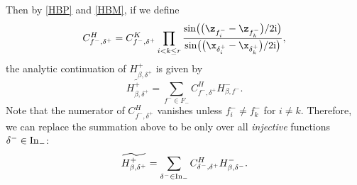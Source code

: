 Then by \eqref{HBP} and \eqref{HBM}, if we define
\[
C^H_{f^-, \delta^+} = C^K_{f^-, \delta^+} \prod_{i<k\leq r} \frac{\sin\bigl(\bigl(\z_{f^-_i} - \z_{f^-_k}\bigr)/2{\rm i}\bigr)}{ \sin\bigl(\bigl(\x_{\delta^+_i} - \x_{\delta^+_k}\bigr)/2{\rm i}\bigr)},
\]
the analytic continuation of $H^{+}_{\beta, \delta^+}$ is given by
\[
\widetilde{H^{+}_{\beta, \delta^+}} =\sum_{f^- \in F_-} C^H_{f^-, \delta^+} H^{-}_{\beta, f^-}.
\]
Note that the numerator of $C^H_{f^-, \delta^+}$ vanishes unless $f^-_i \neq f^-_k$ for $i \neq k$. Therefore, we can replace the summation above to be only over all \emph{injective} functions $\delta^- \in {\rm In}_-$:
\begin{equation}\label{e: CH} \widetilde{H^{+}_{\beta, \delta^+}} = \sum_{\delta^- \in {\rm In}_-} C^H_{\delta^-, \delta^+} H^{-}_{\beta, \delta^-}.\end{equation}

